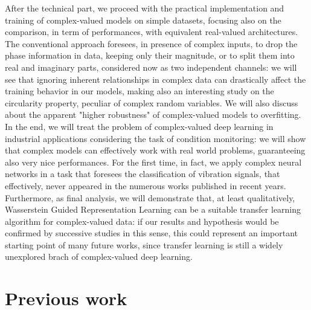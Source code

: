 \documentclass[../main.tex]{subfiles}
\begin{document}
After the technical part, we proceed with the practical implementation and training of complex-valued models on simple datasets, focusing also on the comparison, in term of performances, with equivalent real-valued architectures. The conventional approach foresees, in presence of complex inputs, to drop the phase information in data, keeping only their magnitude, or to split them into real and imaginary parts, considered now as two independent channels: we will see that ignoring inherent relationships in complex data can drastically affect the training behavior in our models, making also an interesting study on the circularity property, peculiar of complex random variables. We will also discuss about the apparent "higher robustness" of complex-valued models to overfitting.\\
In the end, we will treat the problem of complex-valued deep learning in industrial applications considering the task of condition monitoring: we will show that complex models can effectively work with real world problems, guaranteeing also very nice performances. For the first time, in fact, we apply complex neural networks in a task that foresees the classification of vibration signals, that effectively, never appeared in the numerous works published in recent years. Furthermore, as final analysis, we will demonstrate that, at least qualitatively, Wasserstein Guided Representation Learning can be a suitable transfer learning algorithm for complex-valued data: if our results and hypothesis would be confirmed by successive studies in this sense, this could represent an important starting point of many future works, since transfer learning is still a widely unexplored brach of complex-valued deep learning.

\section{Previous work}
\end{document}
